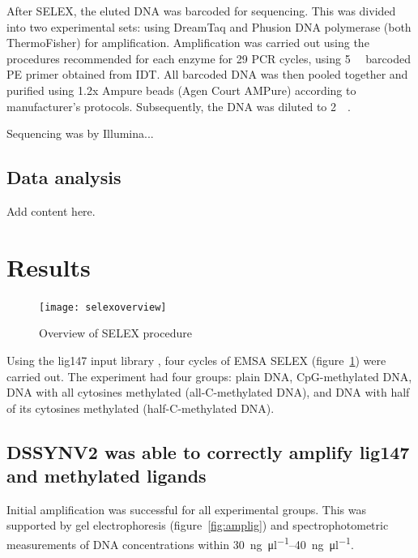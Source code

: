 \documentclass[parskip=full, numbers=noenddot]{scrreprt}
\begin{document}
After SELEX, the eluted DNA was barcoded for sequencing. This was divided into two experimental sets: using DreamTaq and Phusion DNA polymerase (both ThermoFisher) for amplification.  Amplification was carried out using the procedures recommended for each enzyme for 29 PCR cycles, using \SI{5}{\micro\Molar} barcoded PE primer obtained from IDT.  All barcoded DNA was then pooled together and purified using 1.2x Ampure beads (Agen Court AMPure) according to manufacturer's protocols.  Subsequently, the DNA was diluted to \SI{2}{\nano\Molar}.

Sequencing was by Illumina... %

\subsection{Data analysis}
\label{ssec:emsaselex_methods_anal}

Add content here.

\section{Results}
\label{sec:emsaselex_results}

\begin{figure}[htpb]
  \centering
  \texttt{[image: selexoverview]}
  \caption{Overview of SELEX procedure}
  \label{fig:selex}
\end{figure}

Using the lig147 input library \citep{zhu_interaction_2018}, four cycles of EMSA SELEX (figure~\ref{fig:selex}) were carried out.  The experiment had four groups: plain DNA, CpG-methylated DNA, DNA with all cytosines methylated (all-C-methylated DNA), and DNA with half of its cytosines methylated (half-C-methylated DNA).

\subsection{DSSYNV2 was able to correctly amplify lig147 and methylated ligands}
\label{ssec:amplig}


Initial amplification was successful for all experimental groups. This was supported by gel electrophoresis (figure~\ref{fig:amplig}) and spectrophotometric measurements of DNA concentrations within \SIrange{30}{40}{\nano\gram\per\micro\litre}.
\end{document}
